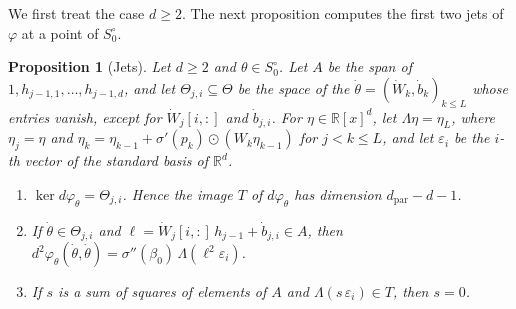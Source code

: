 \documentclass[11pt]{article}
\newtheorem{proposition}[lemma]{Proposition}
\theoremstyle{definition}
\theoremstyle{remark}
\newcommand{\R}{\mathbb{R}}
\newcommand{\dpar}{d_{\mathrm{par}}}
\begin{document}
We first treat the case $d\ge2$. The next proposition computes the first two jets of $\varphi$ at a point of $S_0^\circ$.

\begin{proposition}[Jets]\label{prop:jets}
Let $d\ge2$ and $\theta\in S_0^\circ$. Let $A$ be the span of $1,h_{j-1,1},\dots,h_{j-1,d}$, and let $\Theta_{j,i}\subseteq\Theta$ be the space of the $\dot\theta=(\dot W_k,\dot b_k)_{k\le L}$ whose entries vanish, except for $\dot W_j[i,:]$ and $\dot b_{j,i}$. For $\eta\in\R[x]^d$, let $\Lambda\eta=\eta_L$, where $\eta_j=\eta$ and $\eta_k=\eta_{k-1}+\sigma'(p_k)\odot(W_k\eta_{k-1})$ for $j<k\le L$, and let $\varepsilon_i$ be the $i$-th vector of the standard basis of $\R^d$.
\begin{enumerate}[label=\textup{(\alph*)},nosep]
\item $\ker d\varphi_\theta=\Theta_{j,i}$. Hence the image $T$ of $d\varphi_\theta$ has dimension $\dpar-d-1$.
\item If $\dot\theta\in\Theta_{j,i}$ and $\ell=\dot W_j[i,:]\,h_{j-1}+\dot b_{j,i}\in A$, then $d^2\varphi_\theta(\dot\theta,\dot\theta)=\sigma''(\beta_0)\,\Lambda(\ell^2\varepsilon_i)$.
\item If $s$ is a sum of squares of elements of $A$ and $\Lambda(s\,\varepsilon_i)\in T$, then $s=0$.
\end{enumerate}
\end{proposition}
\end{document}
